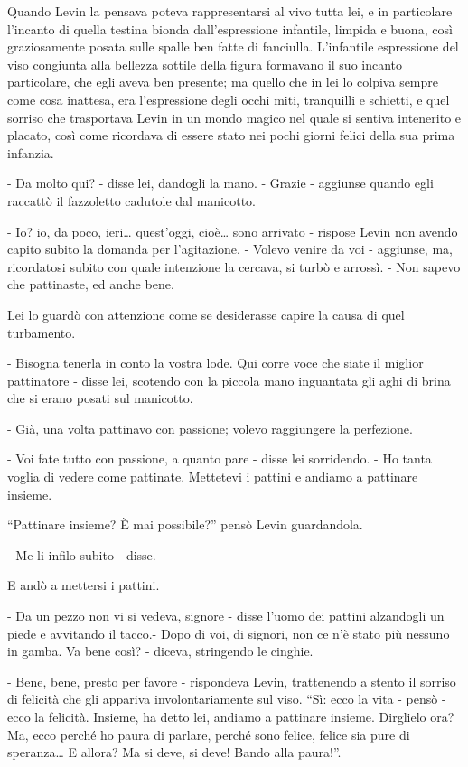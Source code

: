 Quando Levin la pensava poteva rappresentarsi al vivo tutta lei, e in particolare l'incanto di quella testina bionda dall'espressione infantile, limpida e buona, così graziosamente posata sulle spalle ben fatte di fanciulla. L'infantile espressione del viso congiunta alla bellezza sottile della figura formavano il suo incanto particolare, che egli aveva ben presente; ma quello che in lei lo colpiva sempre come cosa inattesa, era l'espressione degli occhi miti, tranquilli e schietti, e quel sorriso che trasportava Levin in un mondo magico nel quale si sentiva intenerito e placato, così come ricordava di essere stato nei pochi giorni felici della sua prima infanzia. 

- Da molto qui? - disse lei, dandogli la mano. - Grazie - aggiunse quando egli raccattò il fazzoletto cadutole dal manicotto. 

- Io? io, da poco, ieri\ldots{} quest'oggi, cioè\ldots{} sono arrivato - rispose Levin non avendo capito subito la domanda per l'agitazione. - Volevo venire da voi - aggiunse, ma, ricordatosi subito con quale intenzione la cercava, si turbò e arrossì. - Non sapevo che pattinaste, ed anche bene. 

Lei lo guardò con attenzione come se desiderasse capire la causa di quel turbamento. 

- Bisogna tenerla in conto la vostra lode. Qui corre voce che siate il miglior pattinatore - disse lei, scotendo con la piccola mano inguantata gli aghi di brina che si erano posati sul manicotto. 

- Già, una volta pattinavo con passione; volevo raggiungere la perfezione. 

- Voi fate tutto con passione, a quanto pare - disse lei sorridendo. - Ho tanta voglia di vedere come pattinate. Mettetevi i pattini e andiamo a pattinare insieme. 

``Pattinare insieme? È mai possibile?'' pensò Levin guardandola. 

- Me li infilo subito - disse. 

E andò a mettersi i pattini. 

- Da un pezzo non vi si vedeva, signore - disse l'uomo dei pattini alzandogli un piede e avvitando il tacco.- Dopo di voi, di signori, non ce n'è stato più nessuno in gamba. Va bene così? - diceva, stringendo le cinghie. 

- Bene, bene, presto per favore - rispondeva Levin, trattenendo a stento il sorriso di felicità che gli appariva involontariamente sul viso. ``Sì: ecco la vita - pensò - ecco la felicità. Insieme, ha detto lei, andiamo a pattinare insieme. Dirglielo ora? Ma, ecco perché ho paura di parlare, perché sono felice, felice sia pure di speranza\ldots{} E allora? Ma si deve, si deve! Bando alla paura!''. 

